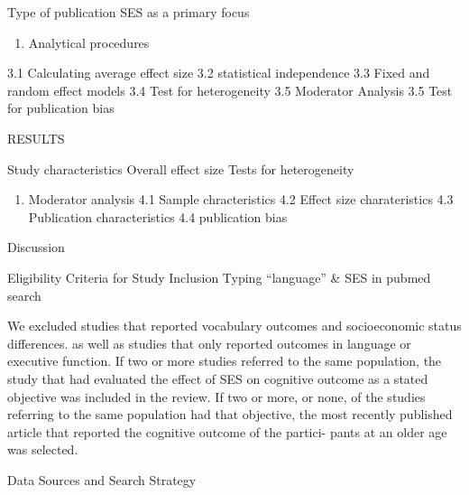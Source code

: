 \documentclass[english,man]{apa6}
\providecommand{\tightlist}{%
  \setlength{\itemsep}{0pt}\setlength{\parskip}{0pt}}
\theoremstyle{definition}
\theoremstyle{definition}
\theoremstyle{definition}
\theoremstyle{remark}
\begin{document}
Type of publication SES as a primary focus

\begin{enumerate}
\def\labelenumi{\arabic{enumi}.}
\setcounter{enumi}{2}
\tightlist
\item
  Analytical procedures
\end{enumerate}

3.1 Calculating average effect size 3.2 statistical independence 3.3
Fixed and random effect models 3.4 Test for heterogeneity 3.5 Moderator
Analysis 3.5 Test for publication bias

RESULTS

Study characteristics Overall effect size Tests for heterogeneity

\begin{enumerate}
\def\labelenumi{\arabic{enumi}.}
\setcounter{enumi}{3}
\tightlist
\item
  Moderator analysis 4.1 Sample chracteristics 4.2 Effect size
  charateristics 4.3 Publication characteristics 4.4 publication bias
\end{enumerate}

Discussion

Eligibility Criteria for Study Inclusion Typing \enquote{language} \&
SES in pubmed search

We excluded studies that reported vocabulary outcomes and socioeconomic
status differences. as well as studies that only reported outcomes in
language or executive function. If two or more studies referred to the
same population, the study that had evaluated the effect of SES on
cognitive outcome as a stated objective was included in the review. If
two or more, or none, of the studies referring to the same population
had that objective, the most recently published article that reported
the cognitive outcome of the partici- pants at an older age was
selected.

Data Sources and Search Strategy
\end{document}

